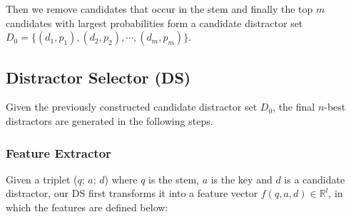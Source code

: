 Then we remove candidates that occur in the stem and finally the top $m$ candidates with largest probabilities form a candidate distractor set $D_0 = \{(d_1, p_1), (d_2, p_2), \cdots,(d_m, p_m) \}$. 

\subsection{Distractor Selector (DS)}
\label{sec:DS}
Given the previously constructed candidate distractor set $D_0$, the final $n$-best distractors are generated in the following steps.
\subsubsection{Feature Extractor}
\label{sec:FE}
Given a triplet ($q$; $a$; $d$) where $q$ is the stem, $a$ is the key and $d$ is a candidate distractor, 
our DS first transforms it into a feature vector $f(q,a,d)\in \mathbb{R}^l$, in which the features are defined below:
